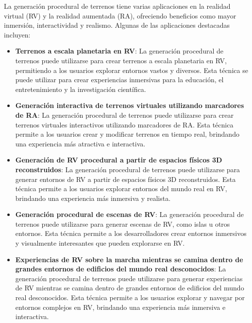 La generación procedural de terrenos tiene varias aplicaciones en la realidad virtual (RV) y la realidad aumentada (RA), ofreciendo beneficios como mayor inmersión, interactividad y realismo. Algunas de las aplicaciones destacadas incluyen:

\begin{itemize}
    \item \textbf{Terrenos a escala planetaria en RV}: La generación procedural de terrenos puede utilizarse para crear terrenos a escala planetaria en RV, permitiendo a los usuarios explorar entornos vastos y diversos. Esta técnica se puede utilizar para crear experiencias inmersivas para la educación, el entretenimiento y la investigación científica\cite{VRPlanetaryTerrains}.
    
    \item \textbf{Generación interactiva de terrenos virtuales utilizando marcadores de RA}: La generación procedural de terrenos puede utilizarse para crear terrenos virtuales interactivos utilizando marcadores de RA. Esta técnica permite a los usuarios crear y modificar terrenos en tiempo real, brindando una experiencia más atractiva e interactiva\cite{ARInteractiveTerrain}.
    
    \item \textbf{Generación de RV procedural a partir de espacios físicos 3D reconstruidos}: La generación procedural de terrenos puede utilizarse para generar entornos de RV a partir de espacios físicos 3D reconstruidos. Esta técnica permite a los usuarios explorar entornos del mundo real en RV, brindando una experiencia más inmersiva y realista\cite{VR3DReconstructedSpace}.
    
    \item \textbf{Generación procedural de escenas de RV}: La generación procedural de terrenos puede utilizarse para generar escenas de RV, como islas u otros entornos. Esta técnica permite a los desarrolladores crear entornos inmersivos y visualmente interesantes que pueden explorarse en RV\cite{VRSceneGeneration}.
    
    \item \textbf{Experiencias de RV sobre la marcha mientras se camina dentro de grandes entornos de edificios del mundo real desconocidos}: La generación procedural de terrenos puede utilizarse para generar experiencias de RV mientras se camina dentro de grandes entornos de edificios del mundo real desconocidos. Esta técnica permite a los usuarios explorar y navegar por entornos complejos en RV, brindando una experiencia más inmersiva e interactiva\cite{VRWalkingEnvironments}.
\end{itemize}

